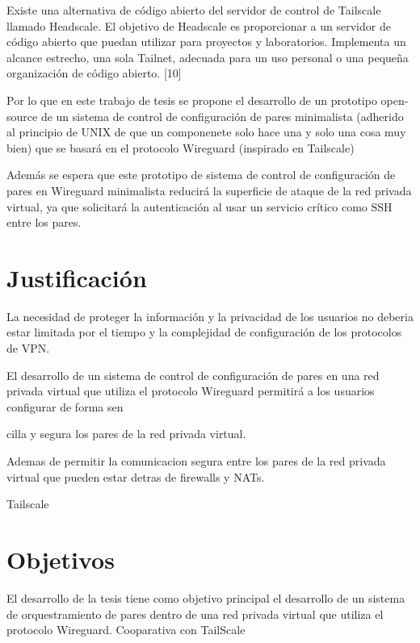 \documentclass{article}
\begin{document}
Existe una alternativa de código abierto del servidor de control de Tailscale llamado Headscale. El objetivo de Headscale es proporcionar a un servidor de código abierto que puedan utilizar para proyectos y laboratorios. Implementa un alcance estrecho, una sola Tailnet, adecuada para un uso personal o una pequeña organización de código abierto. [10]



Por lo que en este trabajo de tesis se propone el desarrollo de un prototipo open-source de un sistema de control de configuración de pares minimalista (adherido al principio de UNIX de que un componenete solo hace una y solo una cosa muy bien) que se basará en el protocolo Wireguard (inspirado en Tailscale) %

Además se espera que este prototipo de sistema de control de configuración de pares en Wireguard minimalista reducirá la superficie de ataque de la red privada virtual, ya que solicitará la autenticación al usar un servicio crítico como SSH entre los pares.

\section{Justificación}
    
La necesidad de proteger la información y la privacidad de los usuarios no deberia estar limitada por el tiempo y la complejidad de configuración de los protocolos de VPN. 

El desarrollo de un sistema de control de configuración de pares en una red privada virtual que utiliza el protocolo Wireguard permitirá a los usuarios configurar de forma sen

cilla y segura los pares de la red privada virtual.

Ademas de permitir la comunicacion segura entre los pares de la red privada virtual que pueden estar detras de firewalls y NATs.

Tailscale

\section{Objetivos}

El desarrollo de la tesis tiene como objetivo principal el desarrollo de un sistema de orquestramiento de pares dentro de una red privada virtual que utiliza el protocolo Wireguard.
Cooparativa con TailScale
\end{document}
